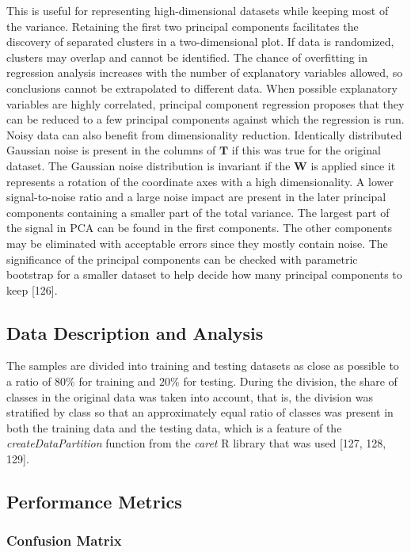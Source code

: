 \documentclass[preprint,12pt]{elsarticle}
\begin{document}
This is useful for representing high-dimensional datasets while keeping most of the variance. Retaining the first two principal components facilitates the discovery of separated clusters in a two-dimensional plot. If data is randomized, clusters may overlap and cannot be identified. The chance of overfitting in regression analysis increases with the number of explanatory variables allowed, so conclusions cannot be extrapolated to different data. When possible explanatory variables are highly correlated, principal component regression proposes that they can be reduced to a few principal components against which the regression is run. Noisy data can also benefit from dimensionality reduction. Identically distributed Gaussian noise is present in the columns of $\mathbf{T}$ if this was true for the original dataset. The Gaussian noise distribution is invariant if the $\mathbf{W}$ is applied since it represents a rotation of the coordinate axes with a high dimensionality. A lower signal-to-noise ratio and a large noise impact are present in the later principal components containing a smaller part of the total variance. The largest part of the signal in PCA can be found in the first components. The other components may be eliminated with acceptable errors since they mostly contain noise. The significance of the principal components can be checked with parametric bootstrap for a smaller dataset to help decide how many principal components to keep [126].

\subsection{Data Description and Analysis}

The samples are divided into training and testing datasets as close as possible to a ratio of $80\%$ for training and $20\%$ for testing. During the division, the share of classes in the original data was taken into account, that is, the division was stratified by class so that an approximately equal ratio of classes was present in both the training data and the testing data, which is a feature of the \textit{createDataPartition} function from the \textit{caret} R library that was used [127, 128, 129].

\subsection{Performance Metrics}

\subsubsection{Confusion Matrix}
\end{document}
